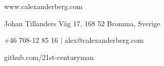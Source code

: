 \documentclass[../main.tex]{subfiles}
\begin{document}
\renewcommand{\maketitle}{
	\begin{center}
		{\LARGE\theauthor}

		www.calexanderberg.com

		Johan Tillanders Väg 17,  168 52 Bromma, Sverige

		+46 708-12 85 16 $|$ alex@calexanderberg.com

		github.com/21st-centuryman
	\end{center}
}

\maketitle
\end{document}
